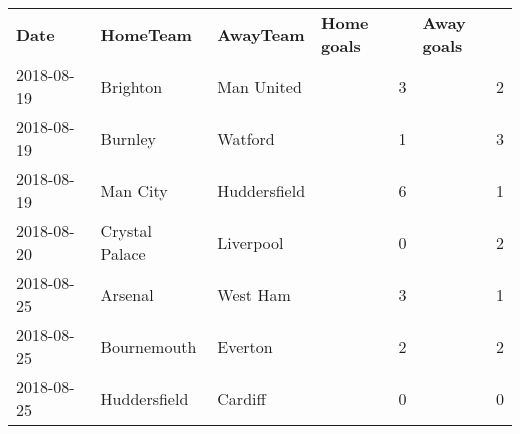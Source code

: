 \begin{tabular}{lllrr}
\textbf{Date} & \textbf{HomeTeam} & \textbf{AwayTeam} & \multicolumn{1}{l}{\textbf{Home goals}} & \multicolumn{1}{l}{\textbf{Away goals}} \\
  2018-08-19 & Brighton & Man United & 3     & 2 \\
  2018-08-19 & Burnley & Watford & 1     & 3 \\
  2018-08-19 & Man City & Huddersfield & 6     & 1 \\
  2018-08-20 & Crystal Palace & Liverpool & 0     & 2 \\
  2018-08-25 & Arsenal & West Ham & 3     & 1 \\
  2018-08-25 & Bournemouth & Everton & 2     & 2 \\
  2018-08-25 & Huddersfield & Cardiff & 0     & 0 \\
\end{tabular}%
